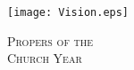\fancyhead[RE,LO]{}\fancyhead[RO,LE]{}
\fancyhead[C]{}\thispagestyle{empty}
{}
  \begin{center}
   \texttt{[image: Vision.eps]}
   \par
   \vspace{2ex}
   	\textsc{\Huge{Propers of the\\
   	Church Year}}
   \end{center}